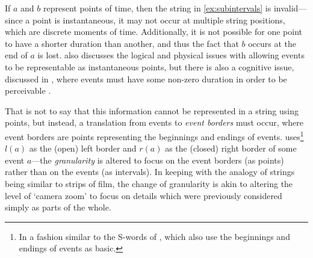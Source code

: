 \documentclass[a4paper,12pt,leqno]{article}
\begin{document}
If $a$ and $b$ represent points of time, then the string in \cref{ex:subintervals} is invalid---since a point is instantaneous, it may not occur at multiple string positions, which are discrete moments of time. Additionally, it is not possible for one point to have a shorter duration than another, and thus the fact that $b$ occurs at the end of $a$ is lost. \citet{allen1983maintaining} also discusses the logical and physical issues with allowing events to be representable as instantaneous points, but there is also a cognitive issue, discussed in \citet{Freksa1992}, where events must have some non-zero duration in order to be perceivable \citep{hamblin1972instants}.

That is not to say that this information cannot be represented in a string using points, but instead, a translation from events to \textit{event borders} must occur, where event borders are points representing the beginnings and endings of events. \citet{Fernando2018,fernando2018prior} uses\footnote{In a fashion similar to the S-words of \citet{durand2008reasoning,durand2008tool}, which also use the beginnings and endings of events as basic.} $l(a)$ as the (open) left border and $r(a)$ as the (closed) right border of some event $a$---the \textit{granularity} is altered to focus on the event borders (as points) rather than on the events (as intervals). In keeping with the analogy of strings being similar to strips of film, the change of granularity is akin to altering the level of `camera zoom' to focus on details which were previously considered simply as parts of the whole.
\end{document}
